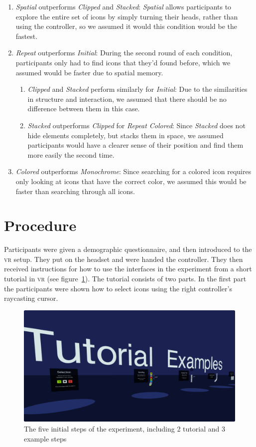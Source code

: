 \documentclass[nobib]{tufte-book} %
\begin{document}
\begin{enumerate}[label=H\arabic*. , wide=0.5em,  leftmargin=*]
  \item \emph{Spatial} outperforms \emph{Clipped} and \emph{Stacked}: \emph{Spatial} allows participants to explore the entire set of icons by simply turning their heads, rather than using the controller, so we assumed it would this condition would be the fastest.
  \item \emph{Repeat} outperforms \emph{Initial}: During the second round of each condition, participants only had to find icons that they'd found before, which we assumed would be faster due to spatial memory.
  \begin{enumerate}[label=H2.\arabic*. , wide=0.5em,  leftmargin=*]
    \item \emph{Clipped} and \emph{Stacked} perform similarly for \emph{Initial}: Due to the similarities in structure and interaction, we assumed that there should be no difference between them in this case.
    \item \emph{Stacked} outperforms \emph{Clipped} for \emph{Repeat Colored}: Since \emph{Stacked} does not hide elements completely, but stacks them in space, we assumed participants would have a clearer sense of their position and find them more easily the second time.
  \end{enumerate}
  \item \emph{Colored} outperforms \emph{Monochrome}: Since searching for a colored icon requires only looking at icons that have the correct color, we assumed this would be faster than searching through all icons.
\end{enumerate}

\section{Procedure}
Participants were given a demographic questionnaire, and then introduced to the \textsc{vr} setup. They put on the headset and were handed the controller. They then received instructions for how to use the interfaces in the experiment from a short tutorial in \textsc{vr} (see figure~\ref{fig:tutorials}). The tutorial consists of two parts.
In the first part the participants were shown how to select icons using the right controller's raycasting cursor.

\begin{figure}
  \includegraphics{tutorials.png}
  \caption{The five initial steps of the experiment, including 2 tutorial and 3 example steps}
  \label{fig:tutorials}
\end{figure}
\end{document}
